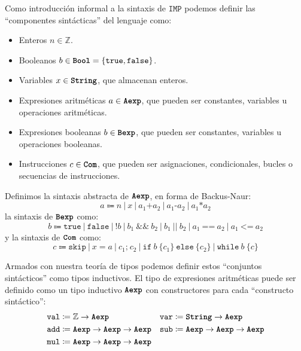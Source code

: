 \documentclass[
  a4paper, 
  10pt, 
  parskip=half, 
  toc=bibliography,
]{scrbook}
\theoremstyle{definition}
\theoremstyle{bolddef}
\newcommand{\funfont}[1]{\texttt{#1}}
\newcommand{\tyfont}[1]{\texttt{\textbf{#1}}}
\newcommand{\ImpIfElse}[3]{\texttt{if} \ {#1} \ \{{#2}\} \ \texttt{else} \ \{{#3}\}}
\newcommand{\ImpWhile}[2]{\texttt{while} \ {#1} \ \{{#2}\}}
\newcommand{\ImpConcat}[2]{{#1} \texttt{;} \ {#2}}
\newcommand{\ImpSkip}{\texttt{skip}}
\newcommand{\ImpAssign}[2]{{#1} = {#2}}
\newcommand{\ImpPlus}{\mathbin{\texttt{+}}}
\newcommand{\ImpMinus}{\mathbin{\texttt{-}}}
\newcommand{\ImpTimes}{\mathbin{\texttt{*}}}
\newcommand{\ImpNot}{\texttt{!}}
\newcommand{\ImpAnd}{\mathbin{\texttt{\&\&}}}
\newcommand{\ImpOr}{\mathbin{\texttt{||}}}
\newcommand{\ImpEq}{\mathbin{\texttt{==}}}
\newcommand{\ImpLe}{\mathbin{\texttt{<=}}}
\newcommand{\ImpTrue}{\texttt{true}}
\newcommand{\ImpFalse}{\texttt{false}}
\newcommand{\ImpName}{\texttt{IMP}}
\begin{document}
Como introducción informal a la sintaxis de \(\ImpName\) podemos definir las
\enquote{componentes sintácticas} del lenguaje como:
\begin{itemize}
  \item Enteros \(n \in \mathbb{Z}\).
  \item Booleanos \(b \in \tyfont{Bool} = \{\ImpTrue, \ImpFalse\}\).
  \item Variables \(x \in \tyfont{String}\), que almacenan enteros.
  \item Expresiones aritméticas \(a \in \tyfont{Aexp}\), que pueden ser constantes,
    variables u operaciones aritméticas.
  \item Expresiones booleanas \(b \in \tyfont{Bexp}\), que pueden ser constantes,
    variables u operaciones booleanas.
  \item Instrucciones \(c \in \tyfont{Com}\), que pueden ser asignaciones, condicionales,
    bucles o secuencias de instrucciones.
\end{itemize}

Definimos la sintaxis abstracta de \(\tyfont{Aexp}\), en forma de Backus-Naur:
\[
a \Coloneqq n \ | \ x \ | \ a_1 \ImpPlus a_2 \ | \ a_1 \ImpMinus a_2 \ | \ a_1 \ImpTimes a_2
\]
la sintaxis de \(\tyfont{Bexp}\) como:
\[
b \Coloneqq \ImpTrue \ | \ \ImpFalse \ | \ 
  \ImpNot b \ | \ b_1 \ \ImpAnd \ b_2 \ | \ b_1 \ \ImpOr \ b_2 \ | \ a_1 \ \ImpEq \ a_2 \ | \ a_1 \ \ImpLe \ a_2
\]
y la sintaxis de \(\tyfont{Com}\) como:
\[
c \Coloneqq \ImpSkip \ | \ \ImpAssign{x}{a} \ | \ \ImpConcat{c_1}{c_2} \ | \ \ImpIfElse{b}{c_1}{c_2} \ | \ \ImpWhile{b}{c}
\]

Armados con nuestra teoría de tipos podemos definir estos \enquote{conjuntos sintácticos}
como tipos inductivos. El tipo de expresiones aritméticas puede ser definido como un
tipo inductivo \(\tyfont{Aexp}\) con constructores para cada \enquote{constructo
sintáctico}:
\begin{align*}
  \funfont{val} &\coloneqq \mathbb{Z} \to \tyfont{Aexp} &
  \funfont{var} &\coloneqq \tyfont{String} \to \tyfont{Aexp} \\
  \funfont{add} &\coloneqq \tyfont{Aexp} \to \tyfont{Aexp} \to \tyfont{Aexp} &
  \funfont{sub} &\coloneqq \tyfont{Aexp} \to \tyfont{Aexp} \to \tyfont{Aexp} \\
  \funfont{mul} &\coloneqq \tyfont{Aexp} \to \tyfont{Aexp} \to \tyfont{Aexp}
\end{align*}
\end{document}
